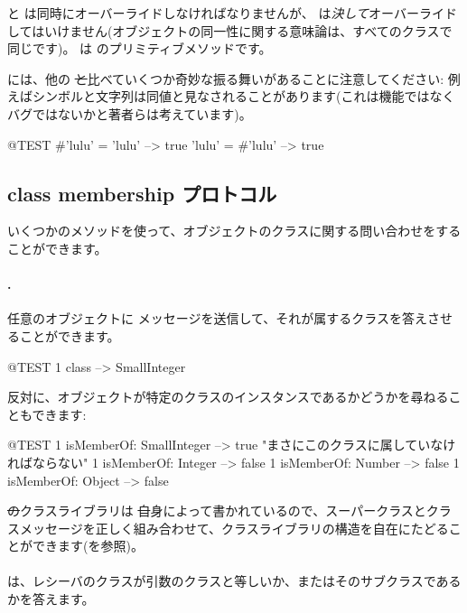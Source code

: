 \documentclass[a4paper,10pt,twoside]{book}
\begin{document}
\ct{=} と  は同時にオーバーライドしなければなりませんが、\ct{==} は\emph{決して}オーバーライドしてはいけません(オブジェクトの同一性に関する意味論は、すべてのクラスで同じです)。\ct{==} は  のプリミティブメソッドです。%

\pharo には、他の \st と比べていくつか奇妙な振る舞いがあることに注意してください: 例えばシンボルと文字列は同値と見なされることがあります(これは機能ではなくバグではないかと著者らは考えています)。

\begin{code}{@TEST}
#'lulu' = 'lulu' --> true
'lulu' = #'lulu' --> true
\end{code}


\subsection{class membership プロトコル}
いくつかのメソッドを使って、オブジェクトのクラスに関する問い合わせをすることができます。

\paragraph{.} 任意のオブジェクトに  メッセージを送信して、それが属するクラスを答えさせることができます。
\begin{code}{@TEST}
1 class --> SmallInteger
\end{code}

反対に、オブジェクトが特定のクラスのインスタンスであるかどうかを尋ねることもできます:
\begin{code}{@TEST}
1 isMemberOf: SmallInteger --> true    "まさにこのクラスに属していなければならない"
1 isMemberOf: Integer          --> false
1 isMemberOf: Number        --> false
1 isMemberOf: Object           --> false
\end{code}

\st のクラスライブラリは \st 自身によって書かれているので、スーパークラスとクラスメッセージを正しく組み合わせて、クラスライブラリの構造を自在にたどることができます(を参照)。

\paragraph{}
 は、レシーバのクラスが引数のクラスと等しいか、またはそのサブクラスであるかを答えます。
\end{document}
